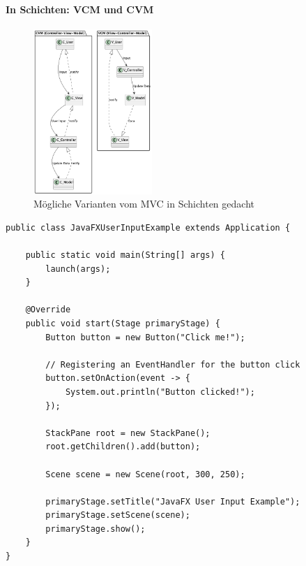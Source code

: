 \begin{frame}
  \framesubtitle{In Schichten: VCM und CVM}
  \begin{figure}[ht]
    \centering
    \includegraphics[width=0.40\textwidth]{fig/uml/mvc-varianten.png}
    \caption{Mögliche Varianten vom MVC in Schichten gedacht}
    \label{fig:mvs-varianten}
  \end{figure}
\end{frame}


\begin{frame}[fragile]
\begin{table}[ht]
\noindent\begin{minipage}[b]{1\linewidth}\centering
\begin{lstlisting}[caption={Java FX Input},captionpos=b,label={lst:javafx-input}]
public class JavaFXUserInputExample extends Application {

    public static void main(String[] args) {
        launch(args);
    }

    @Override
    public void start(Stage primaryStage) {
        Button button = new Button("Click me!");

        // Registering an EventHandler for the button click
        button.setOnAction(event -> {
            System.out.println("Button clicked!");
        });

        StackPane root = new StackPane();
        root.getChildren().add(button);

        Scene scene = new Scene(root, 300, 250);

        primaryStage.setTitle("JavaFX User Input Example");
        primaryStage.setScene(scene);
        primaryStage.show();
    }
}
\end{lstlisting}
\end{minipage}
\end{table}
\end{frame}

